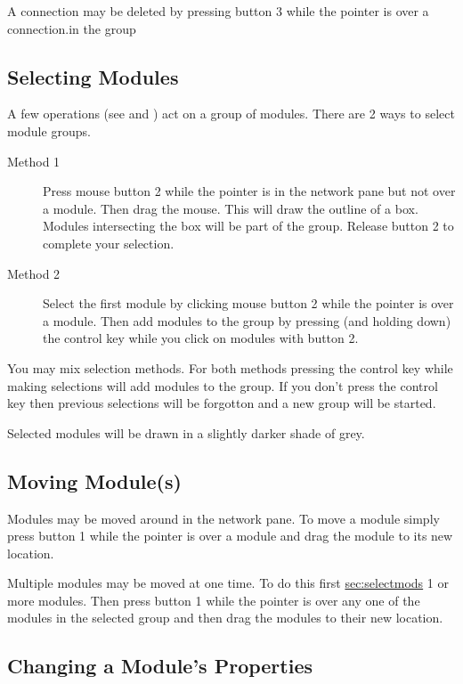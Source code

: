 A connection may be deleted by pressing button 3 while the pointer is
over a connection.in the group 

\subsection{Selecting Modules}
\label{sec:selectmods}

A few operations (see  and
) act on a group of
modules.  There are 2 ways to select module groups.

\begin{description}
\item[Method 1] Press mouse button 2 while the pointer is in the network
  pane but not over a module.  Then drag the mouse.  This will draw the
  outline of a box.  Modules intersecting the box will be part of the
  group.  Release button 2 to complete your selection.
\item[Method 2] Select the first module by clicking mouse
  button 2 while the pointer is over a module.  Then add modules to the
  group by pressing (and holding down) the control key while you click on
  modules with button 2.
\end{description}

You may mix selection methods.  For both methods pressing the control key
while making selections will add modules to the group.  If you don't press
the control key then previous selections will be forgotton and a new group
will be started.

Selected modules will be drawn in a slightly darker shade of grey.

\subsection{Moving Module(s)}
\label{sec:movemod}

Modules may be moved around in the network pane.  To move a module simply
press button 1 while the pointer is over a module and drag the module to
its new location.

Multiple modules may be moved at one time.  To do this first
\hyperref{select}{select (see Section~}{)}{sec:selectmods} 1 or more
modules. Then press button 1 while the pointer is over any one of the
modules in the selected group and then drag the modules to their new location.


\subsection{Changing a Module's Properties}
\label{sec:setmodprops}

